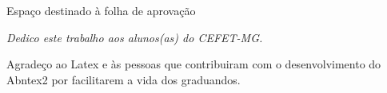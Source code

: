 






%
\begin{folhadeaprovacao}

  \begin{center}
    Espaço destinado à folha de aprovação
% 
  \end{center}
  
\end{folhadeaprovacao}

\begin{dedicatoria}
   \vspace*{\fill}
   \centering
   \noindent
   \textit{Dedico este trabalho aos alunos(as) do CEFET-MG.} \vspace*{\fill}
\end{dedicatoria}

\begin{agradecimentos}
Agradeço ao Latex e às pessoas que contribuiram com o desenvolvimento do Abntex2 por facilitarem a vida dos graduandos.
\end{agradecimentos}

